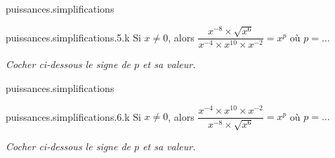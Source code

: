 \begin{qcm}{puissances.simplifications}
    \begin{questionmult}{puissances.simplifications.5.k}
	Si \(x \neq 0\), alors \(\dfrac{x^{-8}\times {\sqrt{x^6}}}{x^{-4}\times x^{10} \times x^{-2}}=x^p\) où \(p=\ldots\)
	
    \noindent\textit{Cocher ci-dessous le signe de \(p\) et sa valeur.}
    \vspace{-1.2ex}
    \footnotesize{
    	  }
    \end{questionmult}
\end{qcm}

\begin{qcm}{puissances.simplifications}
    \begin{questionmult}{puissances.simplifications.6.k}
	Si \(x \neq 0\), alors \(\dfrac{x^{-4}\times x^{10} \times x^{-2}}{x^{-8}\times {\sqrt{x^6}}}=x^p\) où \(p=\ldots\)
    
    \noindent\textit{Cocher ci-dessous le signe de \(p\) et sa valeur.}
    \vspace{-1.2ex}
    \footnotesize{
    	  }
    \end{questionmult}
\end{qcm}


  
  

